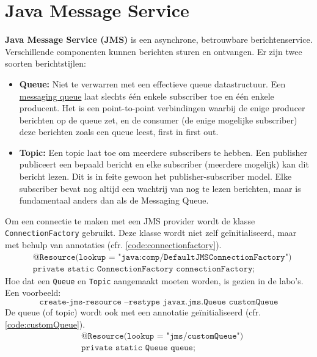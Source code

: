 \documentclass{report}
\begin{document}
\chapter{Java Message Service}
\textbf{Java Message Service (JMS)} is een asynchrone, betrouwbare berichtenservice. Verschillende componenten kunnen berichten sturen en ontvangen. Er zijn twee soorten berichtstijlen:
\begin{itemize}
	\item[\info] \textbf{Queue:} Niet te verwarren met een effectieve queue datastructuur. Een \underline{messaging queue} laat slechts één enkele subscriber toe en één enkele producent. Het is een point-to-point verbindingen waarbij de enige producer berichten op de queue zet, en de consumer (de enige mogelijke subscriber) deze berichten zoals een queue leest, first in first out.
	\item[\info] \textbf{Topic:} Een topic laat toe om meerdere subscribers te hebben. Een publisher publiceert een bepaald bericht en elke subscriber (meerdere mogelijk) kan dit bericht lezen. Dit is in feite gewoon het publisher-subscriber model. Elke subscriber bevat nog altijd een wachtrij van nog te lezen berichten, maar is fundamentaal anders dan als de Messaging Queue.
\end{itemize}
Om een connectie te maken met een JMS provider wordt de klasse \texttt{ConnectionFactory} gebruikt. Deze klasse wordt niet zelf geïnitialiseerd, maar met behulp van annotaties (cfr. \ref{code:connectionfactory}).
\begin{equation}
	\begin{split}
		& \texttt{@Resource(lookup = "java:comp/DefaultJMSConnectionFactory")} \\
		& \texttt{private static ConnectionFactory connectionFactory;}
	\end{split}
	\label{code:connectionfactory}
\end{equation}
Hoe dat een \texttt{Queue} en \texttt{Topic} aangemaakt moeten worden, is gezien in de labo's. Een voorbeeld:
	$$\texttt{create-jms-resource --restype javax.jms.Queue customQueue}$$
De queue (of topic) wordt ook met een annotatie geïnitialiseerd (cfr. \ref{code:customQueue}).
\begin{equation}
	\begin{split}
		& \texttt{@Resource(lookup = "jms/customQueue")} \\
		& \texttt{private static Queue queue;}
	\end{split}
	\label{code:customQueue}
\end{equation}
\end{document}
